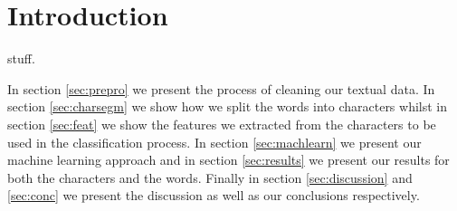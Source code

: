 
\section{Introduction}
\label{sec:intro}
  stuff.




In section \ref{sec:prepro} we present the process of cleaning our textual data. In section \ref{sec:charsegm} we show how we split the words into characters whilst in section \ref{sec:feat} we show the features we extracted from the characters to be used in the classification process. In section \ref{sec:machlearn} we present our machine learning approach and in section \ref{sec:results} we present our results for both the characters and the words. Finally in section \ref{sec:discussion} and \ref{sec:conc} we present the discussion as well as our conclusions respectively.